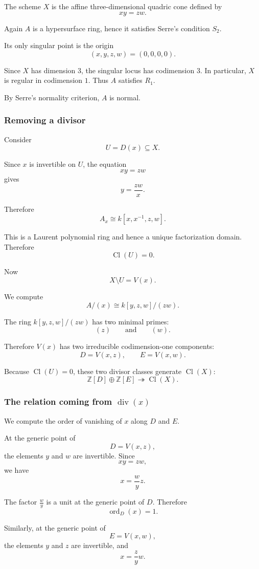 \documentclass[12pt,a4paper]{article}
\newcommand{\divisor}{\operatorname{div}}
\newcommand{\Z}{\mathbb{Z}}
\newcommand{\Cl}{\operatorname{Cl}}
\theoremstyle{notespace}
\begin{document}
The scheme \(X\) is the affine three-dimensional quadric cone defined by
\[
xy=zw.
\]

Again \(A\) is a hypersurface ring, hence it satisfies Serre's condition \(S_2\).

Its only singular point is the origin
\[
(x,y,z,w)=(0,0,0,0).
\]

Since \(X\) has dimension \(3\), the singular locus has codimension \(3\). In particular, \(X\) is regular in codimension \(1\). Thus \(A\) satisfies \(R_1\).

By Serre's normality criterion, \(A\) is normal.

\subsubsection{Removing a divisor}

Consider
\[
U=D(x)\subseteq X.
\]

Since \(x\) is invertible on \(U\), the equation
\[
xy=zw
\]
gives
\[
y=\frac{zw}{x}.
\]

Therefore
\[
A_x
\cong
k[x,x^{-1},z,w].
\]

This is a Laurent polynomial ring and hence a unique factorization domain. Therefore
\[
\Cl(U)=0.
\]

Now
\[
X\setminus U=V(x).
\]

We compute
\[
A/(x)
\cong
k[y,z,w]/(zw).
\]

The ring \(k[y,z,w]/(zw)\) has two minimal primes:
\[
(z)
\qquad\text{and}\qquad
(w).
\]

Therefore \(V(x)\) has two irreducible codimension-one components:
\[
D=V(x,z),
\qquad
E=V(x,w).
\]

Because \(\Cl(U)=0\), these two divisor classes generate \(\Cl(X)\):
\[
\Z[D]\oplus \Z[E]
\twoheadrightarrow
\Cl(X).
\]

\subsubsection{The relation coming from \(\divisor(x)\)}

We compute the order of vanishing of \(x\) along \(D\) and \(E\).

At the generic point of
\[
D=V(x,z),
\]
the elements \(y\) and \(w\) are invertible. Since
\[
xy=zw,
\]
we have
\[
x=\frac{w}{y}z.
\]

The factor \(\frac{w}{y}\) is a unit at the generic point of \(D\). Therefore
\[
\operatorname{ord}_D(x)=1.
\]

Similarly, at the generic point of
\[
E=V(x,w),
\]
the elements \(y\) and \(z\) are invertible, and
\[
x=\frac{z}{y}w.
\]
\end{document}
